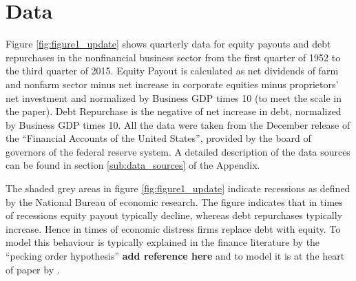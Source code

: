 \section{Data}
\label{sec:data}

Figure \ref{fig:figure1_update} shows quarterly data for equity payouts and
debt repurchases in the nonfinancial business sector from the first quarter of
1952 to the third quarter of 2015. Equity Payout is calculated as net
dividends of farm and nonfarm sector minus net increase in corporate equities
minus proprietors’ net investment and normalized by Business GDP times 10 (to
meet the scale in the paper). Debt Repurchase is the negative of net increase in
debt, normalized by Business GDP times 10. All the data were taken from the
December release of the ``Financial Accounts of the United States'', provided
by the board of governors of the federal reserve system. A detailed description
of the data sources can be found in section \ref{sub:data_sources} of the
Appendix. 



The shaded grey areas in figure \ref{fig:figure1_update} indicate recessions as
defined by the National Bureau of economic research. The figure indicates that
in times of recessions equity payout typically decline, whereas debt
repurchases typically increase. Hence in times of economic distress firms
replace debt with equity. To model this behaviour is typically explained in the
finance literature by the ``pecking order hypothesis'' \textbf{add reference
  here} and to model it is at the heart of paper by
\textcite{jerman_macroeconomic_2012}.
